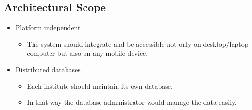 \subsection{Architectural Scope}


\begin{itemize}	
		\item Platform independent
			\begin{itemize}
				\item The system should integrate and be accessible not only on 						desktop/laptop computer but also on any mobile device.
			\end{itemize}
\end{itemize}

\begin{itemize}	
		\item Distributed databases
			\begin{itemize}
				\item Each institute should maintain its own database. 
				\item In that way the database administrator would manage the data 						easily.
			\end{itemize}
\end{itemize}

